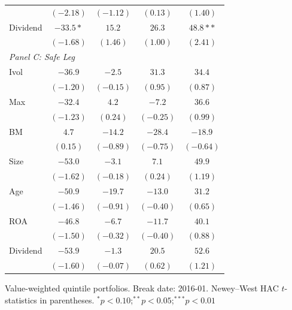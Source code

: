 \begin{tabular}{l c c c c}
 & $(-2.18)$ & $(-1.12)$ & $(0.13)$ & $(1.40)$ \\
Dividend & $-33.5*$ & $15.2$ & $26.3$ & $48.8**$ \\
 & $(-1.68)$ & $(1.46)$ & $(1.00)$ & $(2.41)$ \\
\midrule
\multicolumn{5}{l}{\textit{Panel C: Safe Leg}} \\
Ivol & $-36.9$ & $-2.5$ & $31.3$ & $34.4$ \\
 & $(-1.20)$ & $(-0.15)$ & $(0.95)$ & $(0.87)$ \\
Max & $-32.4$ & $4.2$ & $-7.2$ & $36.6$ \\
 & $(-1.23)$ & $(0.24)$ & $(-0.25)$ & $(0.99)$ \\
BM & $4.7$ & $-14.2$ & $-28.4$ & $-18.9$ \\
 & $(0.15)$ & $(-0.89)$ & $(-0.75)$ & $(-0.64)$ \\
Size & $-53.0$ & $-3.1$ & $7.1$ & $49.9$ \\
 & $(-1.62)$ & $(-0.18)$ & $(0.24)$ & $(1.19)$ \\
Age & $-50.9$ & $-19.7$ & $-13.0$ & $31.2$ \\
 & $(-1.46)$ & $(-0.91)$ & $(-0.40)$ & $(0.65)$ \\
ROA & $-46.8$ & $-6.7$ & $-11.7$ & $40.1$ \\
 & $(-1.50)$ & $(-0.32)$ & $(-0.40)$ & $(0.88)$ \\
Dividend & $-53.9$ & $-1.3$ & $20.5$ & $52.6$ \\
 & $(-1.60)$ & $(-0.07)$ & $(0.62)$ & $(1.21)$ \\
\bottomrule
\end{tabular}
\vspace{4pt}
\begin{minipage}{0.9\textwidth}
\footnotesize
Value-weighted quintile portfolios. Break date: 2016-01.
Newey--West HAC $t$-statistics in parentheses.
$^{*}p<0.10$;\quad $^{**}p<0.05$;\quad $^{***}p<0.01$
\end{minipage}